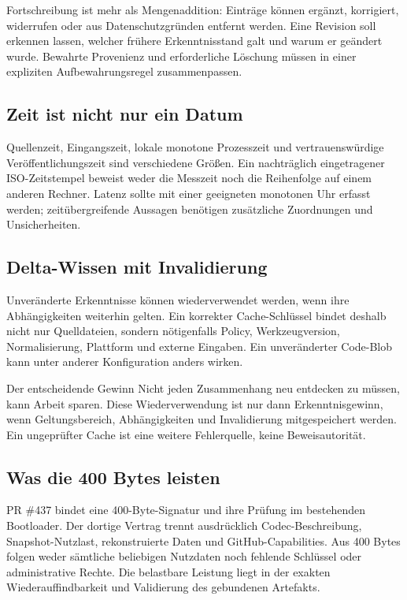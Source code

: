 \begin{cols}
Fortschreibung ist mehr als Mengenaddition: Einträge können ergänzt, korrigiert, widerrufen oder aus Datenschutzgründen entfernt werden. Eine Revision soll erkennen lassen, welcher frühere Erkenntnisstand galt und warum er geändert wurde. Bewahrte Provenienz und erforderliche Löschung müssen in einer expliziten Aufbewahrungsregel zusammenpassen.

\subsection*{Zeit ist nicht nur ein Datum}
Quellenzeit, Eingangszeit, lokale monotone Prozesszeit und vertrauenswürdige Veröffentlichungszeit sind verschiedene Größen. Ein nachträglich eingetragener ISO-Zeitstempel beweist weder die Messzeit noch die Reihenfolge auf einem anderen Rechner. Latenz sollte mit einer geeigneten monotonen Uhr erfasst werden; zeitübergreifende Aussagen benötigen zusätzliche Zuordnungen und Unsicherheiten.

\subsection*{Delta-Wissen mit Invalidierung}
Unveränderte Erkenntnisse können wiederverwendet werden, wenn ihre Abhängigkeiten weiterhin gelten. Ein korrekter Cache-Schlüssel bindet deshalb nicht nur Quelldateien, sondern nötigenfalls Policy, Werkzeugversion, Normalisierung, Plattform und externe Eingaben. Ein unveränderter Code-Blob kann unter anderer Konfiguration anders wirken. 

\begin{boundary}{Der entscheidende Gewinn}
Nicht jeden Zusammenhang neu entdecken zu müssen, kann Arbeit sparen. Diese Wiederverwendung ist nur dann Erkenntnisgewinn, wenn Geltungsbereich, Abhängigkeiten und Invalidierung mitgespeichert werden. Ein ungeprüfter Cache ist eine weitere Fehlerquelle, keine Beweisautorität.
\end{boundary}

\subsection*{Was die 400 Bytes leisten}
PR \#437 bindet eine 400-Byte-Signatur und ihre Prüfung im bestehenden Bootloader. Der dortige Vertrag trennt ausdrücklich Codec-Beschreibung, Snapshot-Nutzlast, rekonstruierte Daten und GitHub-Capabilities. Aus 400 Bytes folgen weder sämtliche beliebigen Nutzdaten noch fehlende Schlüssel oder administrative Rechte. Die belastbare Leistung liegt in der exakten Wiederauffindbarkeit und Validierung des gebundenen Artefakts. 
\end{cols}

